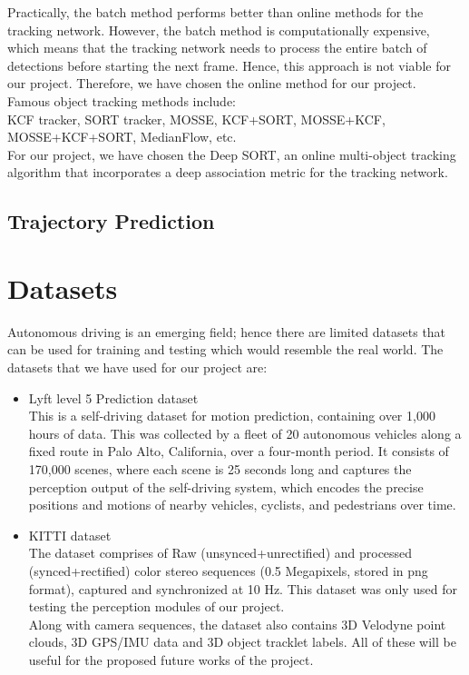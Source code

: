 \documentclass[conference]{IEEEtran}
\begin{document}
Practically, the batch method performs better than online methods for the tracking network. However, the batch method is computationally expensive, which means that the tracking network needs to process the entire batch of detections before starting the next frame. Hence, this approach is not viable for our project. Therefore, we have chosen the online method for our project. \\
Famous object tracking methods include:\\
KCF tracker, SORT tracker, MOSSE, KCF+SORT, MOSSE+KCF, MOSSE+KCF+SORT, MedianFlow, etc. \\

For our project, we have chosen the Deep SORT, an online multi-object tracking algorithm that incorporates a deep association metric for the tracking network.

\subsection{Trajectory Prediction}


\section{Datasets}
Autonomous driving is an emerging field; hence there are limited datasets that can be used for training and testing which would resemble the real world. The datasets that we have used for our project are:
\begin{itemize}
  \item Lyft level 5 Prediction dataset \cite{ Lyft} \\
        This is a self-driving dataset for motion prediction, containing over 1,000 hours of data. This was collected by a fleet of 20 autonomous vehicles along a fixed route in Palo Alto, California, over a four-month period. It consists of 170,000 scenes, where each scene is 25 seconds long and captures the perception output of the self-driving system, which encodes the precise positions and motions of nearby vehicles, cyclists, and pedestrians over time.
  \item KITTI dataset \cite{KITTI} \\
        The dataset comprises of Raw (unsynced+unrectified) and processed (synced+rectified) color stereo sequences (0.5 Megapixels, stored in png format), captured and synchronized at 10 Hz. This dataset was only used for testing the perception modules of our project. \\
        Along with camera sequences, the dataset also contains 3D Velodyne point clouds, 3D GPS/IMU data and 3D object tracklet labels. All of these will be useful for the proposed future works of the project. \\
\end{itemize}
\end{document}
